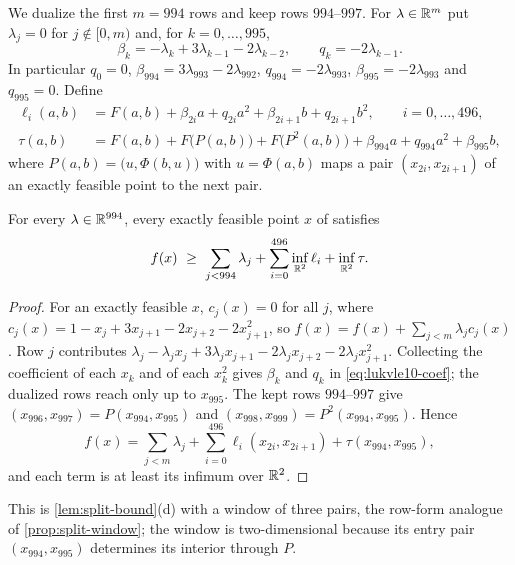 We dualize the first $m=994$ rows and keep rows $994$--$997$.
For $\lambda\in\mathbb{R}^m$ put $\lambda_j=0$ for $j\notin[0,m)$ and, for $k=0,\dots,995$,
\begin{equation}\label{eq:lukvle10-coef}
\beta_k=-\lambda_k+3\lambda_{k-1}-2\lambda_{k-2},\qquad q_k=-2\lambda_{k-1}.
\end{equation}
In particular $q_0=0$, $\beta_{994}=3\lambda_{993}-2\lambda_{992}$, $q_{994}=-2\lambda_{993}$, $\beta_{995}=-2\lambda_{993}$ and $q_{995}=0$.
Define
\begin{align*}
\ell_i(a,b)&=F(a,b)+\beta_{2i}a+q_{2i}a^2+\beta_{2i+1}b+q_{2i+1}b^2, \qquad i=0,\dots,496,\\
\tau(a,b)&=F(a,b)+F\bigl(P(a,b)\bigr)+F\bigl(P^2(a,b)\bigr)+\beta_{994}a+q_{994}a^2+\beta_{995}b,
\end{align*}
where $P(a,b)=\bigl(u,\Phi(b,u)\bigr)$ with $u=\Phi(a,b)$ maps a pair $(x_{2i},x_{2i+1})$ of an exactly feasible point to the next pair.

\begin{lemma}\label{lem:lukvle10-partial}
For every $\lambda\in\mathbb{R}^{994}$, every exactly feasible point $x$ of  satisfies
\[
f(x)\ \ge\ \sum_{j<994}\lambda_j+\sum_{i=0}^{496}\inf_{\R^2}\ell_i+\inf_{\R^2}\tau .
\]
\end{lemma}

\begin{proof}
For an exactly feasible $x$, $c_j(x)=0$ for all $j$, where $c_j(x)=1-x_j+3x_{j+1}-2x_{j+2}-2x_{j+1}^2$, so $f(x)=f(x)+\sum_{j<m}\lambda_jc_j(x)$.
Row $j$ contributes $\lambda_j-\lambda_jx_j+3\lambda_jx_{j+1}-2\lambda_jx_{j+2}-2\lambda_jx_{j+1}^2$.
Collecting the coefficient of each $x_k$ and of each $x_k^2$ gives $\beta_k$ and $q_k$ in \eqref{eq:lukvle10-coef}; the dualized rows reach only up to $x_{995}$.
The kept rows $994$--$997$ give $(x_{996},x_{997})=P(x_{994},x_{995})$ and $(x_{998},x_{999})=P^2(x_{994},x_{995})$.
Hence
\[
f(x)=\sum_{j<m}\lambda_j+\sum_{i=0}^{496}\ell_i(x_{2i},x_{2i+1})+\tau(x_{994},x_{995}),
\]
and each term is at least its infimum over $\mathbb{R}^2$.
\end{proof}

This is \cref{lem:split-bound}(d) with a window of three pairs, the row-form analogue of \cref{prop:split-window}; the window is two-dimensional because its entry pair $(x_{994},x_{995})$ determines its interior through $P$.

